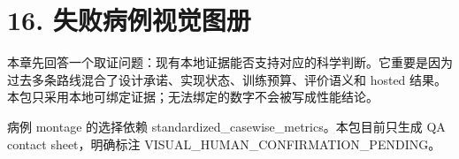 \section{16. 失败病例视觉图册}

本章先回答一个取证问题：现有本地证据能否支持对应的科学判断。它重要是因为过去多条路线混合了设计承诺、实现状态、训练预算、评价语义和 hosted 结果。本包只采用本地可绑定证据；无法绑定的数字不会被写成性能结论。



病例 montage 的选择依赖 standardized_casewise_metrics。本包目前只生成 QA contact sheet，明确标注 VISUAL_HUMAN_CONFIRMATION_PENDING。



\clearpage